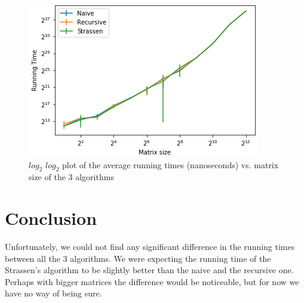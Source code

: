 \documentclass{tufte-handout}
\begin{document}
\begin{figure}[h!tb]
\centering
  \includegraphics[scale=0.67]{out/matrixMultiplication/matrixmult.png}
  \caption{$log_2$ $log_2$ plot of the average running times (nanoseconds) vs. matrix size of the $3$ algorithms}
  \label{fig:Plot}
\end{figure}

\section{Conclusion}
Unfortunately, we could not find any significant difference in the running times between all the $3$ algorithms. We were expecting the running time of the Strassen's algorithm to be slightly better than the naive and the recursive one. Perhaps with bigger matrices the difference would be noticeable, but for now we have no way of being sure.
\end{document}
